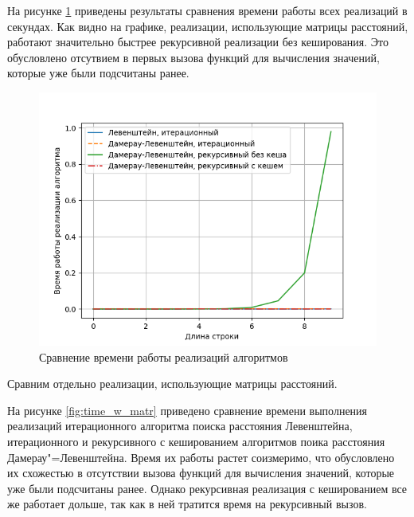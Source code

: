 На рисунке \ref{fig:time_all} приведены результаты сравнения времени работы всех реализаций в секундах. Как видно на графике, реализации, использующие матрицы расстояний, работают значительно быстрее рекурсивной реализации без кеширования. Это обусловлено отсутвием в первых вызова функций для вычисления значений, которые уже были подсчитаны ранее.
\clearpage

\begin{figure}[h!btp]
	\centering
	\includegraphics[width=400pt]{inc/time_all.png}
	\caption{Сравнение времени работы реализаций алгоритмов}
	\label{fig:time_all}	
\end{figure}

Сравним отдельно реализации, использующие матрицы расстояний.
 
На рисунке \ref{fig:time_w_matr} приведено сравнение времени выполнения реализаций итерационного алгоритма поиска расстояния Левенштейна, итерационного и рекурсивного с кешированием алгоритмов поика расстояния Дамерау"=Левенштейна. Время их работы растет соизмеримо, что обусловлено их схожестью в отсутствии вызова функций для вычисления значений, которые уже были подсчитаны ранее. Однако рекурсивная реализация с кешированием все же работает дольше, так как в ней тратится время на рекурсивный вызов. 
\clearpage

